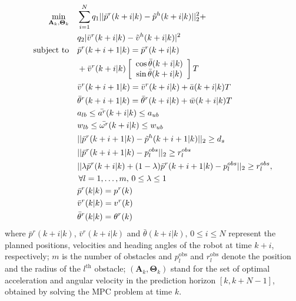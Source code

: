 \documentclass[letterpaper, 10 pt, conference]{ieeeconf}
\begin{document}
\begin{subequations}\label{eqn:path_plan_mpc}
\begin{align}
\min_{\mathbf{A}_k,\mathbf{\Theta}_k} \quad &\sum\limits_{i=1}^{N} q_1||\bar{p}^r(k+i|k)-\tilde{p}^h(k+i|k)||^2_2+ \notag\\
& q_2|\bar{v}^r(k+i|k)-\tilde{v}^h(k+i|k)|^2\label{eqn:obj}\\
\text{subject to} \quad & \bar{p}^r(k+i+1|k)=\bar{p}^r(k+i|k)\notag\\
&+\bar{v}^r(k+i|k)
\left[ 
\begin{array}{c}
\cos \bar{\theta}(k+i|k)\\
\sin \bar{\theta}(k+i|k)\\
\end{array}
\right]T\label{eqn:constr:dyn_pre_motion}\\
& \bar{v}^r(k+i+1|k)=\bar{v}^r(k+i|k)+\bar{a}(k+i|k)T\label{eqn:constr:dyn_pre_v}\\
& \bar{\theta}^r(k+i+1|k)=\bar{\theta}^r(k+i|k)+\bar{w}(k+i|k)T\label{eqn:constr:dyn_pre_theta}\\
& a_{lb}\le \bar{a^r}(k+i|k)\le a_{ub}\label{eqn:constr:a}\\
& w_{lb}\le \bar{\omega^r}(k+i|k)\le w_{ub}\label{eqn:constr:w}\\
& ||\bar{p}^r(k+i+1|k)-\tilde{p}^h(k+i+1|k)||_2\geq d_s\label{eqn:constr:safety}\\
& ||\bar{p}^r(k+i+1|k)-p^{obs}_l||_2\geq r^{obs}_l\label{eqn:constr:obs1}\\
& ||\lambda \bar{p}^r(k+i|k)+(1-\lambda)\bar{p}^r(k+i+1|k)-p^{obs}_l||_2\geq r^{obs}_l,\notag\\
& \, \forall l=1,\dots,m,\, 0\le \lambda\le 1\label{eqn:constr:obs2}\\
& \bar{p}^r(k|k)=p^r(k)\label{eqn:constr:init_z}\\
& \bar{v}^r(k|k)=v^r(k)\label{eqn:constr:init_v}\\
& \bar{\theta}^r(k|k)=\theta^r(k)\label{eqn:constr:init_theta}
\end{align}
\end{subequations}
where $\bar{p}^r(k+i|k)$, $\bar{v}^r(k+i|k)$ and $\bar{\theta}(k+i|k),\, 0\le i\le N$ represent the planned positions, velocities and heading angles of the robot at time $k+i$, respectively;
$m$ is the number of obstacles and $p^{\text{obs}}_l$ and $r^{\text{obs}}_l$ denote the position and the radius of the $l^{\text{th}}$ obstacle;
$(\mathbf{A}_k,\mathbf{\Theta}_k)$ stand for the set of optimal acceleration and angular velocity in the prediction  horizon $[k,k+N-1]$, obtained by solving the MPC problem at time $k$.
\end{document}
